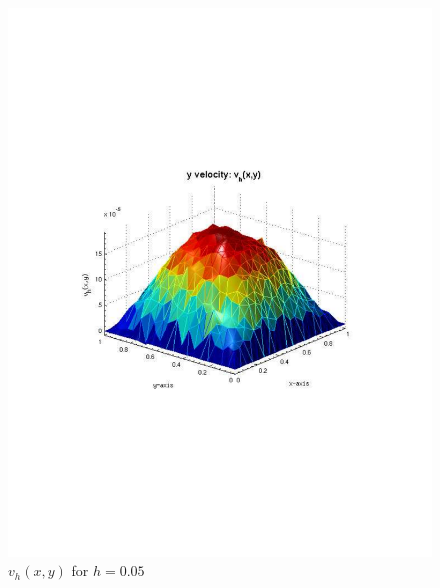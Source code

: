\documentclass[12pt]{article}
\begin{document}
                \begin{figure}[htb]
                    \begin{center}
                \includegraphics[scale=0.50]{./../files/box/2v.pdf}
                \caption{$v_h(x,y)$ for $h = 0.05$}
            \end{center}
            \end{figure}
\end{document}
